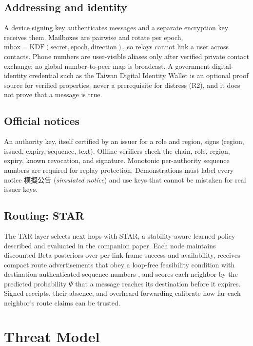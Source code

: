 \documentclass[jou,a4paper,11pt,floatsintext]{apa7}
\begin{document}
\subsection{Addressing and identity}
A device signing key authenticates messages and a separate encryption key receives them. Mailboxes are pairwise and rotate per epoch, $\text{mbox}=\text{KDF}(\text{secret},\text{epoch},\text{direction})$, so relays cannot link a user across contacts. Phone numbers are user-visible aliases only after verified private contact exchange; no global number-to-peer map is broadcast. A government digital-identity credential such as the Taiwan Digital Identity Wallet \parencite{twallet} is an optional proof source for verified properties, never a prerequisite for distress (R2), and it does not prove that a message is true.

\subsection{Official notices}
An authority key, itself certified by an issuer for a role and region, signs (region, issued, expiry, sequence, text). Offline verifiers check the chain, role, region, expiry, known revocation, and signature. Monotonic per-authority sequence numbers are required for replay protection. Demonstrations must label every notice 模擬公告 (\emph{simulated notice}) and use keys that cannot be mistaken for real issuer keys.

\subsection{Routing: STAR}
The TAR layer selects next hops with STAR, a stability-aware learned policy described and evaluated in the companion paper. Each node maintains discounted Beta posteriors over per-link frame success and availability, receives compact route advertisements that obey a loop-free feasibility condition with destination-authenticated sequence numbers \parencite{rfc8966,zapata2002}, and scores each neighbor by the predicted probability $\Psi$ that a message reaches its destination before it expires. Signed receipts, their absence, and overheard forwarding \parencite{marti2000} calibrate how far each neighbor's route claims can be trusted.

\section{Threat Model}
\label{sec:threat}
\end{document}
